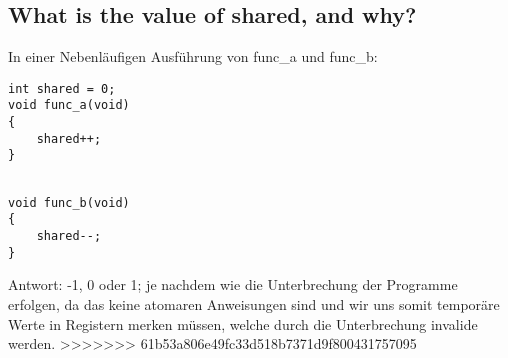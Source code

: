 \subsection{What is the value of shared, and why?}
In einer Nebenläufigen Ausführung von func\_a und func\_b:

\lstset{language=C}
\begin{minipage}{.5\textwidth}
\begin{lstlisting}
int shared = 0;
void func_a(void)
{
    shared++;
}
\end{lstlisting}
\end{minipage}
\begin{minipage}{.5\textwidth}
\begin{lstlisting}

void func_b(void)
{
    shared--;
}
\end{lstlisting}
\end{minipage}

Antwort: -1, 0 oder 1; je nachdem wie die Unterbrechung der Programme erfolgen, da das keine atomaren Anweisungen sind und wir uns somit temporäre Werte in Registern merken müssen, welche durch die Unterbrechung invalide werden.
>>>>>>> 61b53a806e49fc33d518b7371d9f800431757095
